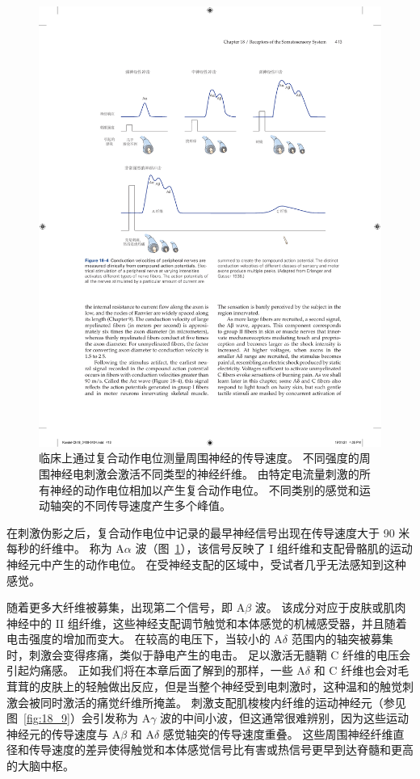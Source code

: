 \begin{figure}[htbp]
	\centering
	\includegraphics[width=1.0\linewidth]{chap18/fig_18_4}
	\caption{临床上通过复合动作电位测量周围神经的传导速度。
		不同强度的周围神经电刺激会激活不同类型的神经纤维。
		由特定电流量刺激的所有神经的动作电位相加以产生复合动作电位。
		不同类别的感觉和运动轴突的不同传导速度产生多个峰值\cite{erlanger2016electrical}。}
	\label{fig:18_4}
\end{figure}


在刺激伪影之后，复合动作电位中记录的最早神经信号出现在传导速度大于 90 米每秒的纤维中。
称为 A$\alpha$ 波（图~\ref{fig:18_4}），该信号反映了 I 组纤维和支配骨骼肌的运动神经元中产生的动作电位。
在受神经支配的区域中，受试者几乎无法感知到这种感觉。


随着更多大纤维被募集，出现第二个信号，即 A$\beta$ 波。
该成分对应于皮肤或肌肉神经中的 II 组纤维，这些神经支配调节触觉和本体感觉的机械感受器，并且随着电击强度的增加而变大。
在较高的电压下，当较小的 A$\delta$ 范围内的轴突被募集时，刺激会变得疼痛，类似于静电产生的电击。
足以激活无髓鞘 C 纤维的电压会引起灼痛感。
正如我们将在本章后面了解到的那样，一些 A$\delta$ 和 C 纤维也会对毛茸茸的皮肤上的轻触做出反应，但是当整个神经受到电刺激时，这种温和的触觉刺激会被同时激活的痛觉纤维所掩盖。
刺激支配肌梭梭内纤维的运动神经元（参见图~\ref{fig:18_9}）会引发称为 A$\gamma$ 波的中间小波，但这通常很难辨别，因为这些运动神经元的传导速度与 A$\beta$ 和 A$\delta$ 感觉轴突的传导速度重叠。
这些周围神经纤维直径和传导速度的差异使得触觉和本体感觉信号比有害或热信号更早到达脊髓和更高的大脑中枢。


